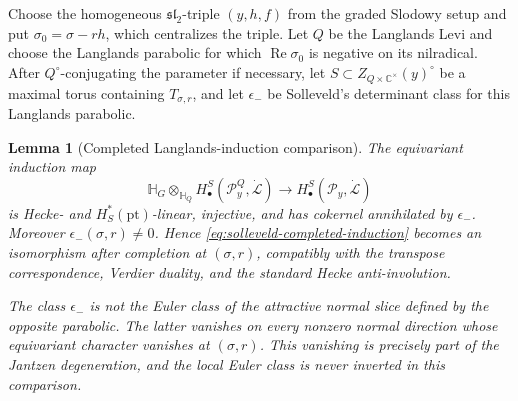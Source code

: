\documentclass[11pt]{amsart}
\newtheorem{lemma}[theorem]{Lemma}
\theoremstyle{definition}
\theoremstyle{remark}
\newcommand{\Hh}{\mathbb H}
\begin{document}
Choose the homogeneous $\mathfrak{sl}_2$-triple $(y,h,f)$ from the graded
Slodowy setup and put
$\sigma_0=\sigma-rh$, which centralizes the triple.  Let $Q$ be the Langlands
Levi and choose the Langlands parabolic for which
$\operatorname{Re}\sigma_0$ is negative on its nilradical.  After
$Q^\circ$-conjugating the parameter if necessary, let
$S\subset Z_{Q\times\mathbb C^\times}(y)^\circ$ be a maximal torus containing
$T_{\sigma,r}$, and let $\epsilon_-$ be Solleveld's
determinant class for this Langlands parabolic.

\begin{lemma}[Completed Langlands-induction comparison]
\label{lem:two-induction-square}
The equivariant induction
map
\begin{equation}\label{eq:solleveld-completed-induction}
 \Hh_G\otimes_{\Hh_Q}
 H^S_\bullet(\mathcal P_y^Q,\dot{\mathcal L})
 \longrightarrow H^S_\bullet(\mathcal P_y,\dot{\mathcal L})
\end{equation}
is Hecke- and $H_S^*(\mathrm{pt})$-linear, injective, and has cokernel
annihilated by $\epsilon_-$.  Moreover $\epsilon_-(\sigma,r)\ne0$.  Hence
\eqref{eq:solleveld-completed-induction} becomes an isomorphism after
completion at $(\sigma,r)$, compatibly with the transpose correspondence,
Verdier duality, and the standard Hecke anti-involution.

The class $\epsilon_-$ is not the Euler class of the attractive normal slice
defined by the opposite parabolic.  The latter vanishes on every nonzero
normal direction whose equivariant character vanishes at $(\sigma,r)$.  This
vanishing is precisely part of the Jantzen degeneration, and the local Euler
class is never inverted in this comparison.
\end{lemma}
\end{document}

